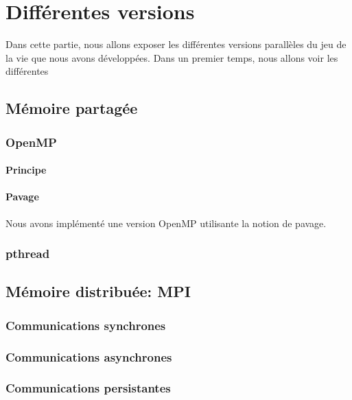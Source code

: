 \section{Différentes versions} %
\label{sec:diff_rents_versions}
Dans cette partie, nous allons exposer les différentes versions parallèles du jeu de la vie que nous avons développées. Dans un premier temps, nous allons voir les différentes

\subsection{Mémoire partagée}
\label{partagee}

\subsubsection{OpenMP}
\label{openmp}
\paragraph{Principe}


\paragraph{Pavage}
Nous avons implémenté une version OpenMP utilisante la notion de \og pavage\fg.

\subsubsection{pthread}
\label{pthread}


\subsection{Mémoire distribuée: MPI} %
\label{mpi}

\subsubsection{Communications synchrones}
\subsubsection{Communications asynchrones}
\subsubsection{Communications persistantes}
